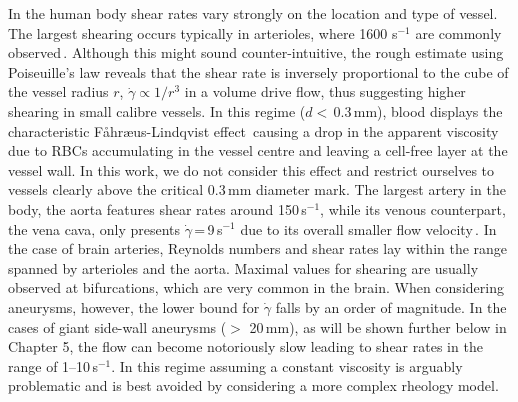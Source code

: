 In the human body shear rates vary strongly on the location and type of vessel. The largest shearing occurs typically in arterioles, where 1600 s$^{-1}$ are commonly observed\,\cite{Lipowsky1978, Lipowsky1980}. Although this might sound counter-intuitive, the rough estimate using Poiseuille's law reveals that the shear rate is inversely proportional to the cube of the vessel radius $r$, $\dot{\gamma} \propto 1/r^3$ in a volume drive flow, thus suggesting higher shearing in small calibre vessels. In this regime ($d<$\,0.3\,mm), blood displays the characteristic Fåhræus-Lindqvist effect\,\cite{fareus1931} causing a drop in the apparent viscosity due to RBCs accumulating in the vessel centre and leaving a cell-free layer at the vessel wall. In this work, we do not consider this effect and restrict ourselves to vessels clearly above the critical 0.3\,mm diameter mark. The largest artery in the body, the aorta features shear rates around 150\,s$^{-1}$, while its venous counterpart, the vena cava, only presents $\dot{\gamma}$\,=\,9\,s$^{-1}$ due to its overall smaller flow velocity\,\cite{Lipowsky1978, Lipowsky1980}. In the case of brain arteries, Reynolds numbers and shear rates lay within the range spanned by arterioles and the aorta. Maximal values for shearing are usually observed at bifurcations, which are very common in the brain. When considering aneurysms, however, the lower bound for $\dot\gamma$ falls by an order of magnitude. In the cases of giant side-wall aneurysms ($>$ 20\,mm), as will be shown further below in Chapter 5, the flow can become notoriously slow leading to shear rates in the range of 1--10\,s$^{-1}$. In this regime assuming a constant viscosity is arguably problematic and is best avoided by considering a more complex rheology model.



